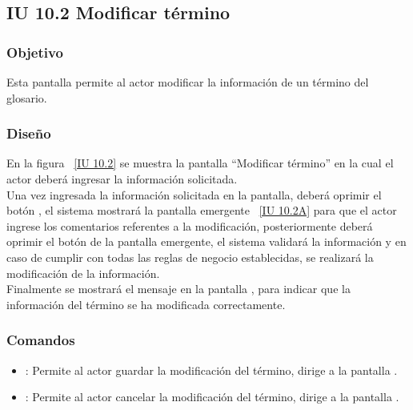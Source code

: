 \subsection{IU 10.2 Modificar término}

\subsubsection{Objetivo}
	
	Esta pantalla permite al actor modificar la información de un término del glosario.

\subsubsection{Diseño}

    En la figura ~\ref{IU 10.2} se muestra la pantalla ``Modificar término'' en la cual el actor deberá ingresar la información solicitada. \\
    
    Una vez ingresada la información solicitada en la pantalla, deberá oprimir el botón , el sistema mostrará la pantalla emergente ~\ref{IU 10.2A} 
    para que el actor ingrese los comentarios referentes a la modificación, posteriormente deberá oprimir el botón  de la pantalla emergente, 
    el sistema validará la información y en caso de cumplir con todas las reglas de negocio establecidas, se realizará la modificación de la información.\\
    
    Finalmente se mostrará el mensaje  en la pantalla , para indicar que la información del término se ha modificada correctamente.        



\subsubsection{Comandos}
\begin{itemize}
	\item {}: Permite al actor guardar la modificación del término, dirige a la pantalla .
	\item {}: Permite al actor cancelar la modificación del término, dirige a la pantalla .
\end{itemize}

